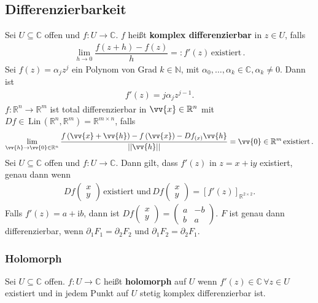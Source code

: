 \documentclass[a4paper,12pt]{article}
\numberwithin{equation}{section}
\begin{document}
\subsection{Differenzierbarkeit}
Sei $U\subseteq \mathbb{C}$ offen und $f:U\rightarrow \mathbb{C}$. $f$ heißt \textbf{komplex differenzierbar} in $z \in U$, falls
\begin{align} 
        \lim_{h\rightarrow 0}\dfrac{f\left(z+h\right)-f\left(z\right)}{h}=:f'\left(z\right)\,\text{existiert}\,
.\end{align} 
Sei $f\left(z\right)=\alpha _jz^j$ ein Polynom von Grad $k \in \mathbb{N}$, mit $\alpha _0,\hdots ,\alpha _k \in \mathbb{C},\alpha _k\neq 0$. Dann ist
\begin{align} 
        f'\left(z\right)=j\alpha _jz^{j-1}
.\end{align} 
$f:\mathbb{R}^n\rightarrow \mathbb{R}^m$ ist total differenzierbar in $\vv{x} \in \mathbb{R}^n$ mit $Df \in \,\text{Lin}\,\left(\mathbb{R}^n,\mathbb{R}^m\right)=\mathbb{R}^{m\times n}$, falls
\begin{align} 
        \lim_{\vv{h}\rightarrow \vv{0} \in \mathbb{R}^n}\dfrac{f\left(\vv{x}+\vv{h}\right)-f\left(\vv{x}\right)-Df_{\left(x\right)}\vv{h}}{||\vv{h}|| }=\vv{0} \in \mathbb{R}^m \,\text{existiert}\,
.\end{align} 
Sei $U\subseteq \mathbb{C}$ offen und $f:U\rightarrow \mathbb{C}$. Dann gilt, dass $f'\left(z\right)$ in $z=x+\text{i}y$ existiert, genau dann wenn
\begin{align} 
        Df \begin{pmatrix}
                x\\y
        \end{pmatrix}\,\text{existiert und}\,Df \begin{pmatrix}
                x\\y
        \end{pmatrix}=\left[f'\left(z\right)\right]_{\mathbb{R}^{2\times 2}}
.\end{align} 
Falls $f'\left(z\right)=a+\text{i}b$, dann ist $Df \begin{pmatrix}
        x\\y
\end{pmatrix}=\begin{pmatrix}
a&-b\\b&a
\end{pmatrix}$. $F$ ist genau dann differenzierbar, wenn $\partial _1F_1=\partial _2F_2$ und $\partial _1F_2=\partial _2F_1$.

\subsubsection{Holomorph}
Sei $U\subseteq \mathbb{C}$ offen. $f:U\rightarrow \mathbb{C}$ heißt \textbf{holomorph} auf $U$ wenn $f'\left(z\right) \in \mathbb{C}\,\forall z \in U$ existiert und in jedem Punkt auf $U$ stetig komplex differenzierbar ist.
\end{document}
